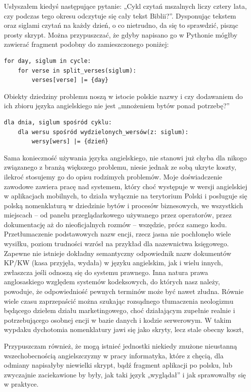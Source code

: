 Usłyszałem kiedyś następujące pytanie: „Cykl czytań mszalnych liczy cztery lata, czy podczas tego okresu odczytuje się cały tekst Biblii?”. Dysponując tekstem oraz siglami czytań na każdy dzień, o co nietrudno, da się to sprawdzić, pisząc prosty skrypt. Można przypuszczać, że gdyby napisano go w Pythonie mógłby zawierać fragment podobny do zamieszczonego poniżej:
\begin{lstlisting}
for day, siglum in cycle:
	for verse in split_verses(siglum):
		verses[verse] |= {day}    
\end{lstlisting}

Obiekty dziedziny problemu noszą w istocie polskie nazwy i czy dodawaniem do ich zbioru języka angielskiego nie jest „mnożeniem bytów ponad potrzebę?”
\begin{lstlisting}
dla dnia, siglum spośród cyklu:
	dla wersu spośród wydzielonych_wersów(z: siglum):
		wersy[wers] |= {dzień}
\end{lstlisting}
Sama konieczność używania języka angielskiego, nie stanowi już chyba dla nikogo związanego z branżą większego problemu, niesie jednak ze sobą ukryte koszty, ilekroć stosujemy go do opisu rodzimych problemów. Moje doświadczenie zawodowe zawiera pracę nad systemem, który choć występuje w wersji angielskiej w aplikacjach mobilnych, to działa wyłącznie na terytorium Polski i posługuje się polską nomenklaturą w dziedzinie bytów i procesów biznesowych, we wszystkich miejscach – od panelu przeglądarkowego używanego przez operatorów, przez dokumentację aż do nieoficjalnych rozmów – wszędzie, prócz samego kodu. Przetłumaczenie podstawowych nazw encji, rzecz jasna nie pochłonęło wiele wysiłku, poziom trudności wzrósł na przykład dla nazewnictwa księgowego. Zapewne nie istnieje dokładny semantyczny odpowiednik nazw dokumentów KP/KW (kasa przyjęła, wydała) w języku angielskim, jak i wielu innych, zwłaszcza jeśli odnoszą się do systemu prawnego. Inna natura prawa anglosaskiego względem systemów kodeksowych, do których nasz należy, powoduje, że odpowiedniość pewnych terminów może być nawet złudna. Równie wiele czasu zaprzepaścić można szukając rozsądnego tłumaczenia neologizmu będącego dziełem działu marketingowego, choć działającym zupełnie realnie i potrzebującego osobnej encji w bazie danych i kodzie serwerowym. W takim wypdaku dychotomia nomenklatury jawi się jako skryty, lecz stale obecny koszt, 

Przypuszczam również, że mogą istnieć jednostki niekiedy znużone nieustanną wszechobecnością angielszczyzny w pracy informatyka, które z chęcią, dla odmiany napisałyby niewielki skrypt, bądź fragment aplikacji po polsku, lub zwyczajnie zaciekawione by były, jak taki język „wyglądał” i jak sprawowałby się w praktyce.

